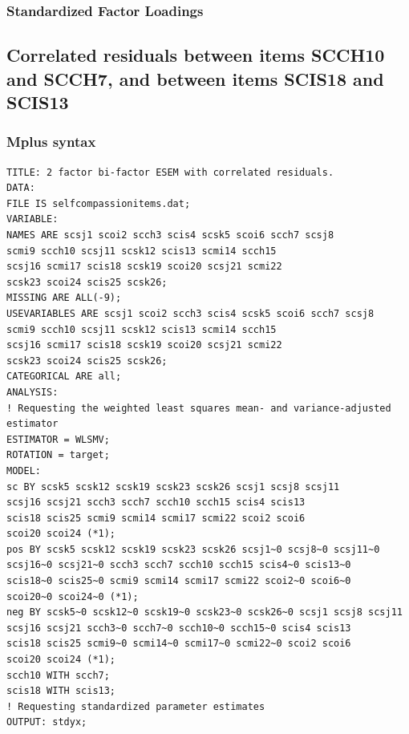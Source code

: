 \documentclass[
  english,
  man,floatsintext]{apa7}
\begin{document}
\begin{appendix}
\hypertarget{standardized-factor-loadings-2}{%
\subsubsection{Standardized Factor
Loadings}\label{standardized-factor-loadings-2}}



\newpage

\hypertarget{correlated-residuals-between-items-scch10-and-scch7-and-between-items-scis18-and-scis13}{%
\subsection{Correlated residuals between items SCCH10 and SCCH7, and
between items SCIS18 and
SCIS13}\label{correlated-residuals-between-items-scch10-and-scch7-and-between-items-scis18-and-scis13}}

\hypertarget{mplus-syntax-2}{%
\subsubsection{Mplus syntax}\label{mplus-syntax-2}}

\begin{verbatim}
TITLE: 2 factor bi-factor ESEM with correlated residuals.
DATA:
FILE IS selfcompassionitems.dat;
VARIABLE:
NAMES ARE scsj1 scoi2 scch3 scis4 scsk5 scoi6 scch7 scsj8 
scmi9 scch10 scsj11 scsk12 scis13 scmi14 scch15 
scsj16 scmi17 scis18 scsk19 scoi20 scsj21 scmi22 
scsk23 scoi24 scis25 scsk26; 
MISSING ARE ALL(-9);
USEVARIABLES ARE scsj1 scoi2 scch3 scis4 scsk5 scoi6 scch7 scsj8 
scmi9 scch10 scsj11 scsk12 scis13 scmi14 scch15 
scsj16 scmi17 scis18 scsk19 scoi20 scsj21 scmi22 
scsk23 scoi24 scis25 scsk26; 
CATEGORICAL ARE all;
ANALYSIS:
! Requesting the weighted least squares mean- and variance-adjusted estimator
ESTIMATOR = WLSMV;
ROTATION = target;
MODEL:
sc BY scsk5 scsk12 scsk19 scsk23 scsk26 scsj1 scsj8 scsj11 
scsj16 scsj21 scch3 scch7 scch10 scch15 scis4 scis13 
scis18 scis25 scmi9 scmi14 scmi17 scmi22 scoi2 scoi6 
scoi20 scoi24 (*1);
pos BY scsk5 scsk12 scsk19 scsk23 scsk26 scsj1~0 scsj8~0 scsj11~0 
scsj16~0 scsj21~0 scch3 scch7 scch10 scch15 scis4~0 scis13~0 
scis18~0 scis25~0 scmi9 scmi14 scmi17 scmi22 scoi2~0 scoi6~0 
scoi20~0 scoi24~0 (*1);
neg BY scsk5~0 scsk12~0 scsk19~0 scsk23~0 scsk26~0 scsj1 scsj8 scsj11 
scsj16 scsj21 scch3~0 scch7~0 scch10~0 scch15~0 scis4 scis13 
scis18 scis25 scmi9~0 scmi14~0 scmi17~0 scmi22~0 scoi2 scoi6 
scoi20 scoi24 (*1);
scch10 WITH scch7;
scis18 WITH scis13;
! Requesting standardized parameter estimates
OUTPUT: stdyx;
\end{verbatim}


\end{appendix}
\end{document}
